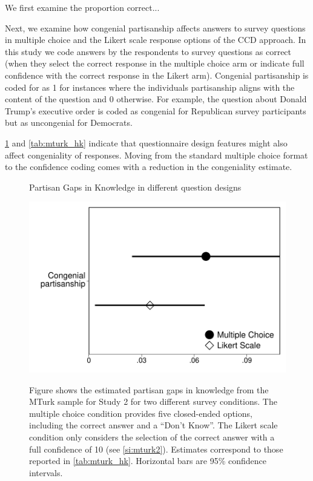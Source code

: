 \documentclass[12pt, letterpaper]{article}
\begin{document}
We first examine the proportion correct...

Next, we examine how congenial partisanship affects answers to survey questions in multiple choice and the Likert scale response options of the CCD approach. In this study we code answers by the respondents to survey questions as correct (when they select the correct response in the multiple choice arm or indicate full confidence with the correct response in the Likert arm). Congenial partisanship is coded for as 1 for instances where the individuals partisanship aligns with the content of the question and 0 otherwise. For example, the question about Donald Trump's executive order is coded as congenial for Republican survey participants but as uncongenial for Democrats.

\cref{fig:mturk_hk} and \cref{tab:mturk_hk} indicate that questionnaire design features might also affect congeniality of responses. Moving from the standard multiple choice format to the confidence coding comes with a reduction in the congeniality estimate.


\begin{center}
	\begin{figure}[h]
		\centering
		\caption{Partisan Gaps in Knowledge in different question designs}
		\includegraphics[width=.55\textwidth]{../figs/mturk-hk-MC-LIKERT.pdf}
		\label{fig:mturk_hk}
		\caption*{\scriptsize
			Figure shows the estimated partisan gaps in knowledge from the MTurk sample for Study 2 for two different survey conditions.
			The multiple choice condition provides five closed-ended options, including the correct answer and a ``Don't Know''.
			The Likert scale condition only considers the selection of the correct answer with a full confidence of 10 (see \cref{si:mturk2}).
			Estimates correspond to those reported in \cref{tab:mturk_hk}.
			Horizontal bars are 95\% confidence intervals.
		}
	\end{figure}
\end{center}


\end{document}
